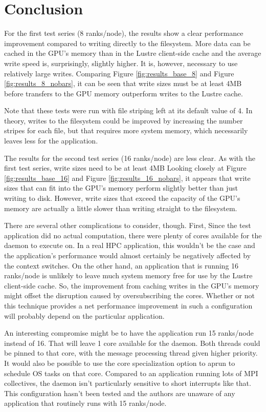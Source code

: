 \section{Conclusion}
\label{sec:conclusion}

For the first test series (8 ranks/node), the results show a clear performance improvement compared to writing directly to the filesystem.   More data can be cached in the GPU's memory than in the Lustre client-side cache and the average write speed is, surprisingly, slightly higher.  It is, however, necessary to use relatively large writes.   Comparing Figure \ref{fig:results_base_8} and Figure \ref{fig:results_8_nobars},  it can be seen that write sizes must be at least 4MB before transfers to the GPU memory outperform writes to the Lustre cache.

Note that these tests were run with file striping left at its default value of 4.  In theory, writes to the filesystem could be improved by increasing the number stripes for each file, but that requires more system memory, which necessarily leaves less for the application.

The results for the second test series (16 ranks/node) are less clear.  As with the first test series, write sizes need to be at least 4MB Looking closely at Figure \ref{fig:results_base_16} and Figure \ref{fig:results_16_nobars}, it appears that write sizes that can fit into the GPU's memory perform slightly better than just writing to disk.  However, write sizes that exceed the capacity of the GPU's memory are actually a little slower than writing straight to the filesystem.

There are several other complications to consider, though.
First, Since the test application did no actual computation, there were plenty of cores available for the daemon to execute on.  In a real HPC application, this wouldn't be the case and the application's performance would almost certainly be negatively affected by the context switches.  On the other hand, an application that is running 16 ranks/node is unlikely to leave much system memory free for use by the Lustre client-side cache.  So, the improvement from caching writes in the GPU's memory might offset the disruption caused by oversubscribing the cores.  Whether or not this technique provides a net performance improvement in such a configuration will probably depend on the particular application.

An interesting compromise might be to have the application run 15 ranks/node instead of 16.  That will leave 1 core available for the daemon.  Both threads could be pinned to that core, with the message processing thread given higher priority.  It would also be possible to use the  core specialization option to aprun to schedule OS tasks on that core.  Compared to an application running lots of MPI collectives, the daemon isn't particularly sensitive to short interrupts like that.  This configuration hasn't been tested and the authors are unaware of any application that routinely runs with 15 ranks/node.

